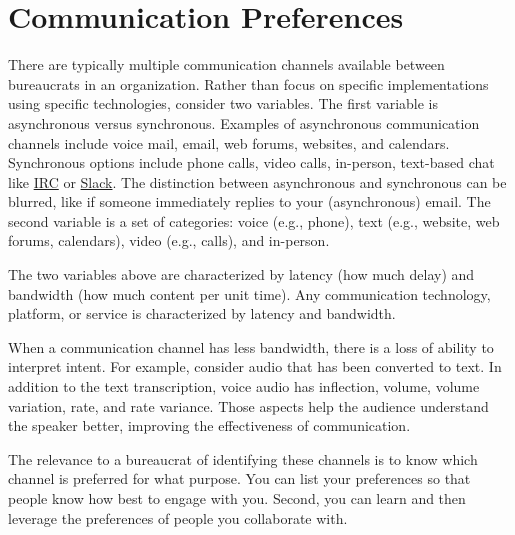 \section{Communication Preferences\label{sec:communication-preferences}}

There are typically multiple communication channels available between bureaucrats in an organization. Rather than focus on specific implementations using specific technologies, consider two variables. The first variable is asynchronous versus synchronous. Examples of asynchronous communication channels include voice mail, email, web forums, websites, and calendars. Synchronous options include phone calls, video calls, in-person, text-based chat like \href{https://en.wikipedia.org/wiki/Internet_Relay_Chat}{IRC}
or \href{https://en.wikipedia.org/wiki/Slack_(software)}{Slack}.  
The distinction between asynchronous and synchronous can be blurred, like if someone immediately replies to your (asynchronous) email.  The second variable is a set of categories: voice (e.g., phone), text (e.g., website, web forums, calendars), video (e.g., calls), and in-person. 

The two variables above are characterized by latency (how much delay) and bandwidth (how much content per unit time). Any  communication technology, platform, or service is characterized by latency and bandwidth. 

When a communication channel has less bandwidth, there is a loss of ability to interpret intent. 
For example, consider audio that has been converted to text. In addition to the text transcription, voice audio  has inflection, volume, volume variation, rate, and rate variance. Those aspects help the audience understand the speaker better, improving the effectiveness of communication.

The relevance to a bureaucrat of identifying these channels is to know which channel is preferred for what purpose.  You can list your preferences so that people know how best to engage with you.
%
%
Second, you can learn and then leverage the preferences of people you collaborate with.
%
%

